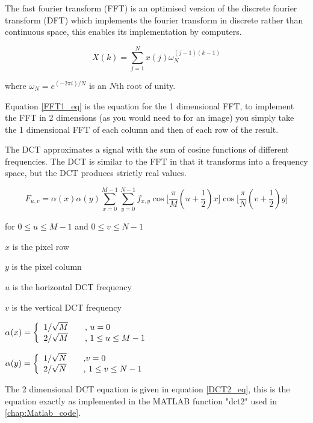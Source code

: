The fast fourier transform (FFT) is an optimised version of the discrete fourier transform (DFT) which implements the fourier transform in discrete rather than continuous space, this enables its implementation by computers.

\begin{equation}
X(k) = \sum_{j=1}^N x(j)\omega _N ^{(j-1)(k-1)}
\label{FFT1_eq}
\end{equation}

where
$ \omega _N = e^{(-2 \pi i)/N} $ is an $N$th root of unity.

Equation \ref{FFT1_eq} is the equation for the 1 dimensional FFT, to implement the FFT in 2 dimensions (as you would need to for an image) you simply take the 1 dimensional FFT of each column and then of each row of the result.

The DCT approximates a signal with the sum of cosine functions of different frequencies. The DCT is similar to the FFT in that it transforms into a frequency space, but the DCT produces strictly real values.

\begin{equation}
F_{u,v} = \alpha(x) \alpha(y) \sum_{x=0}^{M-1} \sum_{y=0}^{N-1} f_{x,y} \cos\Big[\dfrac{\pi}{M}(u+\dfrac{1}{2})x\Big]\cos\Big[\dfrac{\pi}{N}(v+\dfrac{1}{2})y\Big]
\label{DCT2_eq}
\end{equation}

for $0 \leq u \leq M - 1 $ and $0 \leq v \leq N - 1 $

$x$ is the pixel row

$y$ is the pixel column

$u$ is the horizontal DCT frequency

$v$ is the vertical DCT frequency

$
  \alpha(x) = \left\{
  \begin{array}{l l}
    1/ \sqrt{M} & \quad \text{, $u = 0$}\\
    2/ \sqrt{M} & \quad \text{, $1 \leq u \leq M - 1$}\\
  \end{array} \right.
$

$
  \alpha(y) = \left\{
  \begin{array}{l l}
    1/ \sqrt{N} & \quad \text{,$ v = 0$}\\
    2/ \sqrt{N} & \quad \text{, $1 \leq v \leq N - 1$}\\
  \end{array} \right.
$

The 2 dimensional DCT equation is given in equation \ref{DCT2_eq}, this is the equation exactly as implemented in the MATLAB function "dct2" used in \ref{chap:Matlab_code}.

